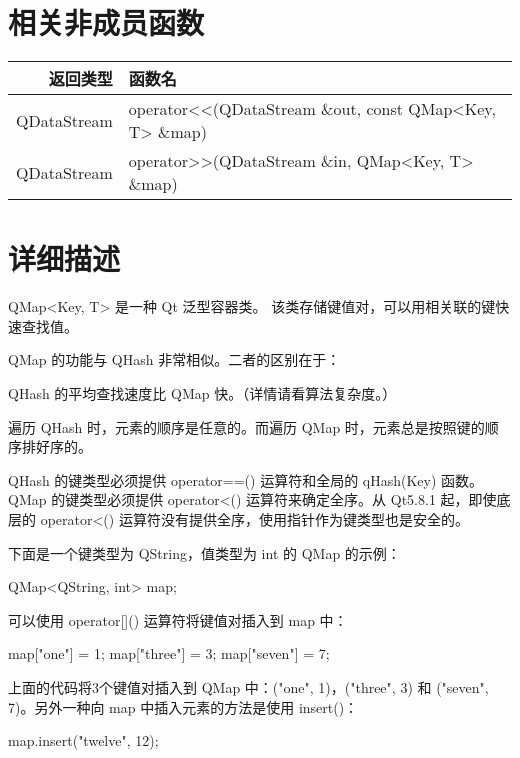 \section{相关非成员函数}

\begin{longtable}{|r|l|}
\hline
返回类型  & 	函数名 \\
\hline
QDataStream &	operator<<(QDataStream \&out, const QMap<Key, T> \&map) \\ 
\hline
QDataStream &	operator>>(QDataStream \&in, QMap<Key, T> \&map) \\  
\hline
\end{longtable}

\section{详细描述}

QMap<Key, T> 是一种 Qt 泛型容器类。
该类存储键值对，可以用相关联的键快速查找值。

QMap 的功能与 QHash 非常相似。二者的区别在于：

\begin{compactitem}
\item QHash 的平均查找速度比 QMap 快。（详情请看算法复杂度。）
\item 遍历 QHash 时，元素的顺序是任意的。而遍历 QMap 时，元素总是按照键的顺序排好序的。
\item QHash 的键类型必须提供 operator==() 运算符和全局的 qHash(Key) 函数。QMap 的键类型必须提供 operator<() 运算符来确定全序。从 Qt5.8.1 起，即使底层的 operator<() 运算符没有提供全序，使用指针作为键类型也是安全的。
\end{compactitem}

下面是一个键类型为 QString，值类型为 int 的 QMap 的示例：

\begin{cppcode}
QMap<QString, int> map;
\end{cppcode}

可以使用 operator[]() 运算符将键值对插入到 map 中：

\begin{cppcode}
map["one"] = 1;
map["three"] = 3;
map["seven"] = 7;
\end{cppcode}


上面的代码将3个键值对插入到 QMap 中：("one", 1)，("three", 3) 和 ("seven", 7)。另外一种向 map 中插入元素的方法是使用 insert()：

\begin{cppcode}
map.insert("twelve", 12);
\end{cppcode}

